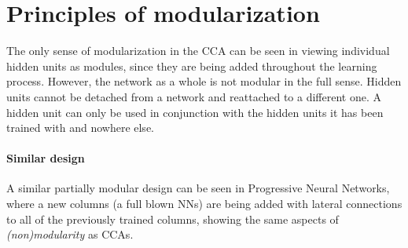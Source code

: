 \documentclass[a4paper,twocolumn]{article}
\begin{document}
\section{Principles of modularization}
The only sense of modularization in the CCA can be seen in viewing individual hidden units as modules, since they are being added throughout the learning process. However, the network as a whole is not modular in the full sense. Hidden units cannot be detached from a network and reattached to a different one. A hidden unit can only be used in conjunction with the hidden units it has been trained with and nowhere else.
\paragraph{Similar design}
A similar partially modular design can be seen in Progressive Neural Networks, where a new columns (a full blown NNs) are being added with lateral connections to all of the previously trained columns, showing the same aspects of \textit{(non)modularity} as CCAs.
\end{document}

